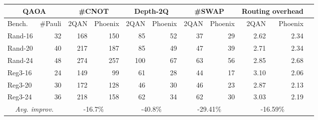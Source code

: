 \begin{tabular}{|l|r|r|r|r|r|r|r|r|r|r|}
    \hline
    \multicolumn{2}{|c|}{QAOA} & \multicolumn{2}{c|}{\#CNOT} & \multicolumn{2}{c|}{Depth-2Q} & \multicolumn{2}{c|}{\#SWAP} & \multicolumn{2}{c|}{Routing overhead} \\ 
    \hline
    Bench. &  \#Pauli & 2QAN & Phoenix & 2QAN & Phoenix & 2QAN & Phoenix & 2QAN & Phoenix \\
    \hline
    Rand-16 & 32 & 168 & 150 & 85 & 52 & 37 & 29 & 2.62 & 2.34 \\
    \hline
    Rand-20 &  40 & 217 & 187 & 85 & 49 & 47 & 39 & 2.71 & 2.34 \\
    \hline
    Rand-24 &  48 & 274 & 257 & 100 & 67 & 63 & 56 & 2.85 & 2.68 \\
    \hline
    Reg3-16 &  24 & 149 & 99 & 61 & 28 & 44 & 17 & 3.10 & 2.06 \\
    \hline
    Reg3-20 &  30 & 172 & 128 & 46 & 30 & 46 & 23 & 2.87 & 2.13 \\
    \hline
    Reg3-24 &  36 & 218 & 158 & 62 & 34 & 62 & 30 & 3.03 & 2.19 \\
    \hline
    \multicolumn{2}{|c|}{\emph{Avg. improv.}} & \multicolumn{2}{c|}{-16.7\%} & \multicolumn{2}{c|}{-40.8\%} & \multicolumn{2}{c|}{-29.41\%} & \multicolumn{2}{c|}{-16.59\%} \\
    \hline
\end{tabular}
    